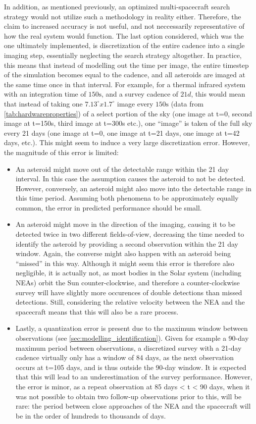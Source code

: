 In addition, as mentioned previously, an optimized multi-spacecraft search strategy would not utilize such a methodology in reality either. Therefore, the claim to increased accuracy is not useful, and not neccessarily representative of how the real system would function. The last option considered, which was the one ultimately implemented, is discretization of the entire cadence into a single imaging step, essentially neglecting the search strategy altogether. In practice, this means that instead of modelling out the time per image, the entire timestep of the simulation becomes equal to the cadence, and all asteroids are imaged at the same time once in that interval. For example, for a thermal infrared system with an integration time of $150\mathrm{s}$, and a survey cadence of $21d$, this would mean that instead of taking one $7.13^\circ x1.7^\circ$ image every $150\mathrm{s}$ (data from \autoref{tab:hardwareproperties}) of a select portion of the sky (one image at t=0, second image at t=150s, third image at t=300s etc.), one ``image'' is taken of the full sky every 21 days (one image at t=0, one image at t=21 days, one image at t=42 days, etc.). This might seem to induce a very large discretization error. However, the magnitude of this error is limited:
\begin{itemize}
 \item An asteroid might move out of the detectable range within the 21 day interval. In this case the assumption causes the asteroid to not be detected. However, conversely, an asteroid might also move into the detectable range in this time period. Assuming both phenomena to be approximately equally common, the error in predicted performance should be small.
 \item An asteroid might move in the direction of the imaging, causing it to be detected twice in two different fields-of-view, decreasing the time needed to identify the asteroid by providing a second observation within the 21 day window. Again, the converse might also happen with an asteroid being ``missed'' in this way. Although it might seem this error is therefore also negligible, it is actually not, as most bodies in the Solar system (including NEAs) orbit the Sun counter-clockwise, and therefore a counter-clockwise survey will have slightly more occurences of double detections than missed detections. Still, considering the relative velocity between the NEA and the spacecraft means that this will also be a rare process.
 \item Lastly, a quantization error is present due to the maximum window between observations (see \autoref{sec:modelling_identification}). Given for example a 90-day maximum period between observations, a discretized survey with a 21-day cadence virtually only has a window of 84 days, as the next observation occurs at t=105 days, and is thus outside the 90-day window. It is expected that this will lead to an underestimation of the survey performance. However, the error is minor, as a repeat observation at 85 days < t < 90 days, when it was not possible to obtain two follow-up observations prior to this, will be rare: the period between close approaches of the NEA and the spacecraft will be in the order of hundreds to thousands of days.
\end{itemize}
